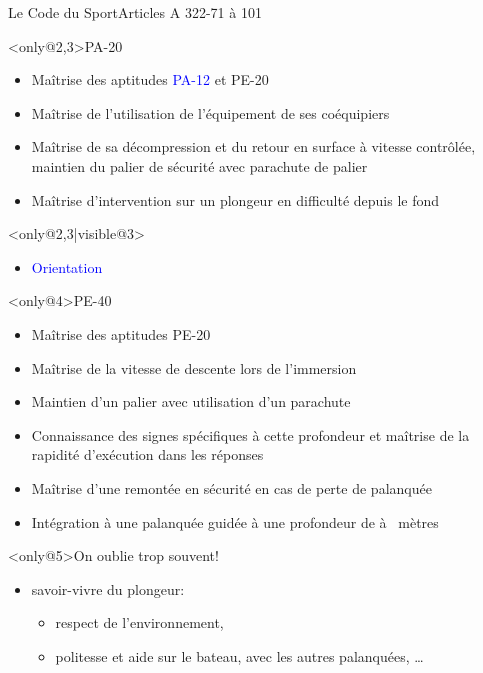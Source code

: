 \begin{frame}{Le Code du Sport}{Articles A 322-71 à 101}
\begin{block}<only@2,3>{PA-20}
\begin{itemize}
\item Maîtrise des aptitudes \textcolor<3>{blue}{PA-12} et PE-20
\item Maîtrise de l'utilisation de l'équipement de ses coéquipiers
\item Maîtrise de sa décompression et du retour en surface à vitesse contrôlée, maintien du palier de sécurité avec parachute de palier
\item Maîtrise d'intervention sur un plongeur en difficulté depuis le fond
\end{itemize}
\end{block}
\begin{block}<only@2,3|visible@3>{}
\begin{itemize}
\item \textcolor{blue}{Orientation}
\end{itemize}
\end{block}
\begin{block}<only@4>{PE-40}
\begin{itemize}
\item Maîtrise des aptitudes PE-20
\item Maîtrise de la vitesse de descente lors de l'immersion
\item Maintien d'un palier avec utilisation d'un parachute
\item Connaissance des signes spécifiques à cette profondeur et maîtrise de la rapidité d'exécution dans les réponses
\item Maîtrise d'une remontée en sécurité en cas de perte de palanquée
\item Intégration à une palanquée guidée à une profondeur de  à ~mètres
\end{itemize}
\end{block}
\begin{alertblock}<only@5>{On oublie trop souvent!}
\begin{itemize}
\item[+] savoir-vivre du plongeur:
  \begin{itemize}
  \item respect de l'environnement,
  \item politesse et aide sur le bateau, avec les autres palanquées, \dots
  \end{itemize}
\end{itemize}
\end{alertblock}
\end{frame}

